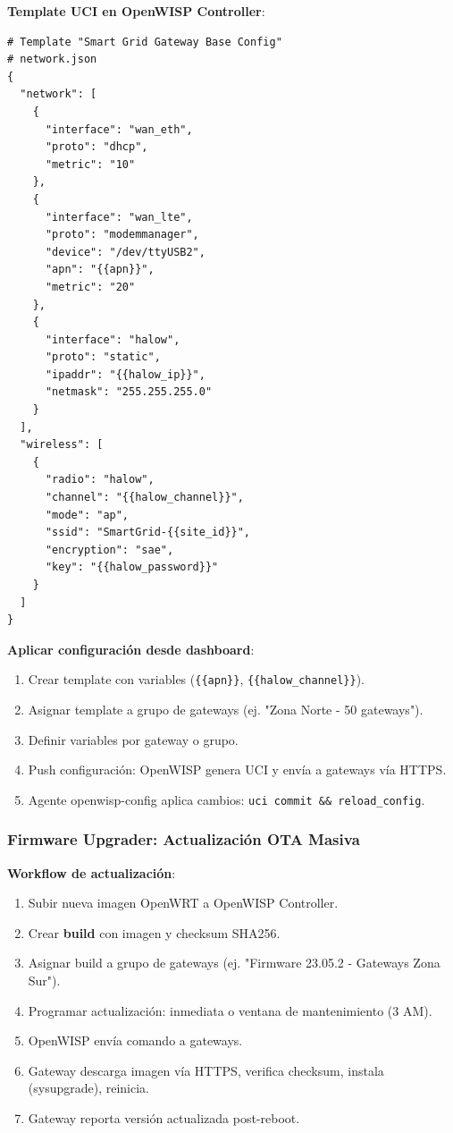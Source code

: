 \textbf{Template UCI en OpenWISP Controller}:
\begin{verbatim}
# Template "Smart Grid Gateway Base Config"
# network.json
{
  "network": [
    {
      "interface": "wan_eth",
      "proto": "dhcp",
      "metric": "10"
    },
    {
      "interface": "wan_lte",
      "proto": "modemmanager",
      "device": "/dev/ttyUSB2",
      "apn": "{{apn}}",
      "metric": "20"
    },
    {
      "interface": "halow",
      "proto": "static",
      "ipaddr": "{{halow_ip}}",
      "netmask": "255.255.255.0"
    }
  ],
  "wireless": [
    {
      "radio": "halow",
      "channel": "{{halow_channel}}",
      "mode": "ap",
      "ssid": "SmartGrid-{{site_id}}",
      "encryption": "sae",
      "key": "{{halow_password}}"
    }
  ]
}
\end{verbatim}

\textbf{Aplicar configuración desde dashboard}:
\begin{enumerate}
    \item Crear template con variables (\texttt{\{\{apn\}\}}, \texttt{\{\{halow\_channel\}\}}).
    \item Asignar template a grupo de gateways (ej. "Zona Norte - 50 gateways").
    \item Definir variables por gateway o grupo.
    \item Push configuración: OpenWISP genera UCI y envía a gateways vía HTTPS.
    \item Agente openwisp-config aplica cambios: \texttt{uci commit \&\& reload\_config}.
\end{enumerate}

\subsubsection{Firmware Upgrader: Actualización OTA Masiva}

\textbf{Workflow de actualización}:
\begin{enumerate}
    \item Subir nueva imagen OpenWRT a OpenWISP Controller.
    \item Crear \textbf{build} con imagen y checksum SHA256.
    \item Asignar build a grupo de gateways (ej. "Firmware 23.05.2 - Gateways Zona Sur").
    \item Programar actualización: inmediata o ventana de mantenimiento (3 AM).
    \item OpenWISP envía comando a gateways.
    \item Gateway descarga imagen vía HTTPS, verifica checksum, instala (sysupgrade), reinicia.
    \item Gateway reporta versión actualizada post-reboot.
\end{enumerate}

